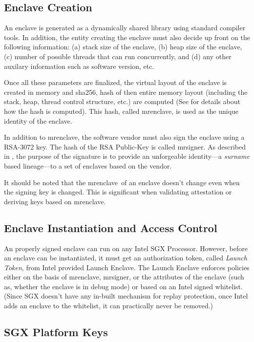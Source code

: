 \documentclass[11pt]{article}
\newcommand{\mrenclave}{\textsf{mrenclave}}
\newcommand{\mrsigner}{\textsf{mrsigner}}
\newcommand{\sha}{\textsf{sha256}}
\begin{document}
  \subsection{Enclave Creation}
  An enclave is generated as a dynamically shared library using
  standard compiler tools. In addition, the entity creating the
  enclave must also decide up front on the following information:  (a)
  stack size of the enclave, (b) heap size of the enclave, (c) number
  of possible threads that can run concurrently, and (d) any other
  auxilary information such as software version, etc.

  Once all these parameters are finalized, the virtual layout of the
  enclave is created in memory and \sha,  hash of then
  entire memory layout (including the stack, heap, thread control
  structure, etc.) are computed (See \cite{intelsdm} for details
  about how the hash is computed). This hash, called
  \mrenclave, is used as the unique identity of the enclave.

  In addition to \textsf{mrenclave}, the software vendor must
  also sign the enclave using a RSA-3072 key. The hash of the RSA
  Public-Key is called \mrsigner. As described in
  \cite{surnaming}, the purpose of the signature is to provide an
  unforgeable identity---a \textit{surname} based lineage---to a set
  of enclaves based on the vendor.

  It should be noted that the \mrenclave\ of an enclave doesn't
  change even when the signing key is changed. This is
  significant when validating attestation or deriving keys based on
  \mrenclave.

  \subsection{Enclave Instantiation and Access Control}
  An properly signed enclave can run on any Intel SGX
  Processor. However, before an enclave can be instantiated, it must
  get an authorization token, called \textit{Launch Token}, from Intel
  provided \textsf{Launch Enclave}. The \textsf{Launch Enclave}
  enforces policies either on the basis of \mrenclave, \mrsigner, or
  the attributes of the enclave (such as, whether the enclave is in
  debug mode) or based on an Intel signed whitelist. (Since SGX
  doesn't have any in-built mechanism for replay protection, once
  Intel adds an enclave to the whitelist, it can practically never be
  removed.)

  \subsection{SGX Platform Keys}
\end{document}
